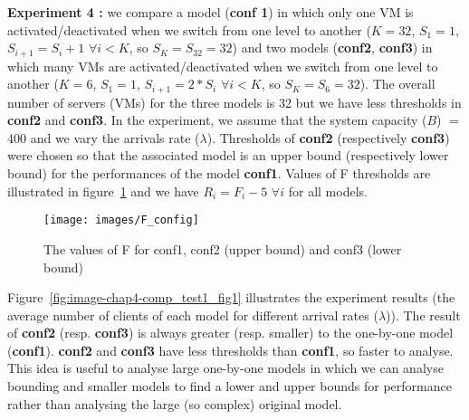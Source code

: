 \documentclass[conference]{IEEEtran}
\begin{document}
\textbf{Experiment 4 :} we compare a model (\textbf{conf 1}) in which only one VM is activated/deactivated when we switch from one level to another  ($K=32$, $S_1=1$, $S_{i+1}=S_{i}+1$ $\forall i<K$, so $S_{K}=S_{32}=32$) and two models (\textbf{conf2}, \textbf{conf3}) in which many VMs are activated/deactivated when we switch from one level to another ($K=6$, $S_1=1$, $S_{i+1}=2*S_{i}$ $\forall i<K$, so $S_{K}=S_{6}=32$). The overall number of servers (VMs) for the three models is 32 but we have less thresholds in \textbf{conf2} and \textbf{conf3}. In the experiment, we assume that the system capacity ($B$) $=$ 400 and we vary the arrivals rate ($\lambda$). Thresholds of \textbf{conf2} (respectively \textbf{conf3}) were chosen so that the associated model is an upper bound (respectively lower bound) for the performances of the model \textbf{conf1}. Values of F thresholds are illustrated in figure~\ref{fig:fconfig} and we have $R_{i}=F_{i}-5$ $\forall i$ for all models. 

\begin{figure}[!t]
\centering
\texttt{[image: images/F\_config]}
\caption{The values of F for conf1, conf2 (upper bound) and conf3 (lower bound)}
\label{fig:fconfig}
\end{figure}

Figure~\ref{fig:image-chap4-comp_test1_fig1} illustrates the experiment results (the average number of clients of each model for different arrival rates ($\lambda$)). The result of \textbf{conf2}  (resp. \textbf{conf3}) is always greater (resp. smaller) to the one-by-one model (\textbf{conf1}). \textbf{conf2} and \textbf{conf3} have less thresholds than \textbf{conf1}, so faster to analyse. This idea is useful to analyse large one-by-one models in which we can analyse bounding and smaller models to find a lower and upper bounds for performance rather than analysing the large (so complex) original model. 
\end{document}

